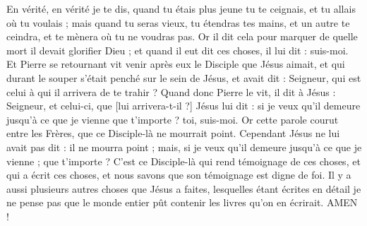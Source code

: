 \begin{multicols}{2}
En vérité, en vérité je te dis, quand tu étais plus jeune tu te ceignais, et tu allais où tu voulais ; mais quand tu seras vieux, tu étendras tes mains, et un autre te ceindra, et te mènera où tu ne voudras pas.
Or il dit cela pour marquer de quelle mort il devait glorifier Dieu ; et quand il eut dit ces choses, il lui dit : suis-moi.
Et Pierre se retournant vit venir après eux le Disciple que Jésus aimait, et qui durant le souper s'était penché sur le sein de Jésus, et avait dit : Seigneur, qui est celui à qui il arrivera de te trahir ?
Quand donc Pierre le vit, il dit à Jésus : Seigneur, et celui-ci, que [lui arrivera-t-il ?]
Jésus lui dit : si je veux qu'il demeure jusqu'à ce que je vienne que t'importe ? toi, suis-moi.
Or cette parole courut entre les Frères, que ce Disciple-là ne mourrait point. Cependant Jésus ne lui avait pas dit : il ne mourra point ; mais, si je veux qu'il demeure jusqu'à ce que je vienne ; que t'importe ?
C'est ce Disciple-là qui rend témoignage de ces choses, et qui a écrit ces choses, et nous savons que son témoignage est digne de foi.
Il y a aussi plusieurs autres choses que Jésus a faites, lesquelles étant écrites en détail je ne pense pas que le monde entier pût contenir les livres qu'on en écrirait. AMEN !
\PPE{}
\end{multicols}
